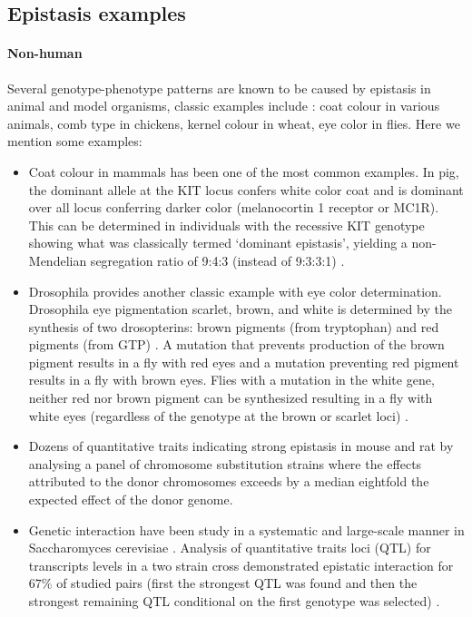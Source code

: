\subsection{Epistasis examples}

\paragraph{Non-human}
Several genotype-phenotype patterns are known to be caused by epistasis in animal and model organisms, classic examples include \cite{carlborg2004epistasis}:
coat colour in various animals, 
comb type in chickens, 
kernel colour in wheat,
eye color in flies. 
Here we mention some examples:

\begin{itemize}

	\item Coat colour in mammals has been one of the most common examples. 
In pig, the dominant allele at the KIT locus confers white color coat and is dominant over all locus conferring darker color (melanocortin 1 receptor or MC1R). 
This can be determined in individuals with the recessive KIT genotype showing what was classically termed `dominant epistasis', 
yielding a non-Mendelian segregation ratio of 9:4:3 (instead of 9:3:3:1) \cite{carlborg2004epistasis, phillips2008epistasis}.

	\item Drosophila provides another classic example with eye color determination.
Drosophila eye pigmentation scarlet, brown, and white is determined by the synthesis of two drosopterins:  brown pigments (from tryptophan) and red pigments (from GTP) \cite{tyler2009shadows:REF}.
A mutation that prevents production of the brown pigment results in a fly with red eyes and a mutation preventing red pigment results in a fly with brown eyes.
Flies with a mutation in the white gene, neither red nor brown pigment can be synthesized resulting in a fly with white eyes (regardless of the genotype at the brown or scarlet loci) \cite{tyler2009shadows}.

	\item Dozens of quantitative traits indicating strong epistasis in mouse and rat \cite{zuk2012mystery:REF22} by analysing a panel of chromosome substitution strains where the effects attributed to the donor chromosomes exceeds by a median eightfold the expected effect of the donor genome.

	\item Genetic interaction have been study in a systematic and large-scale manner in Saccharomyces cerevisiae \cite{mani2008defining:REF}.
Analysis of quantitative traits loci (QTL) for transcripts levels in a two strain cross demonstrated epistatic interaction for $67\%$ of studied pairs (first the strongest QTL was found and then the strongest remaining QTL conditional on the first genotype was selected) \cite{zuk2012mystery:REF}. 


\end{itemize}
